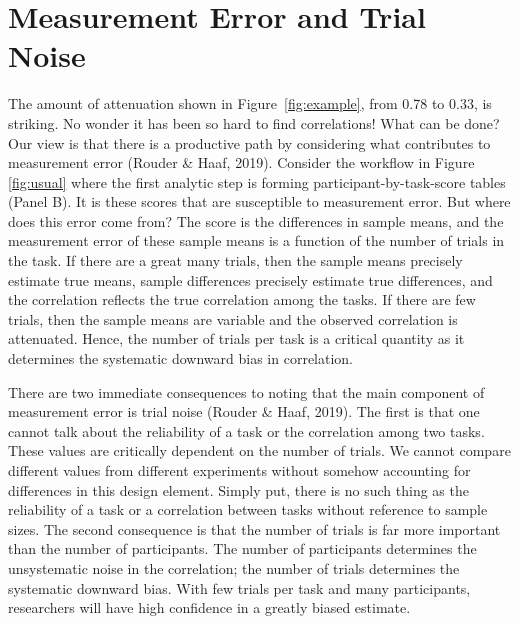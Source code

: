\documentclass[
  english,
  ,man]{apa6}
\begin{document}
\hypertarget{measurement-error-and-trial-noise}{%
\section{Measurement Error and Trial Noise}\label{measurement-error-and-trial-noise}}

The amount of attenuation shown in Figure~\ref{fig:example}, from 0.78 to 0.33, is striking. No wonder it has been so hard to find correlations! What can be done? Our view is that there is a productive path by considering what contributes to measurement error (Rouder \& Haaf, 2019). Consider the workflow in Figure \ref{fig:usual} where the first analytic step is forming participant-by-task-score tables (Panel B). It is these scores that are susceptible to measurement error. But where does this error come from? The score is the differences in sample means, and the measurement error of these sample means is a function of the number of trials in the task. If there are a great many trials, then the sample means precisely estimate true means, sample differences precisely estimate true differences, and the correlation reflects the true correlation among the tasks. If there are few trials, then the sample means are variable and the observed correlation is attenuated. Hence, the number of trials per task is a critical quantity as it determines the systematic downward bias in correlation.

There are two immediate consequences to noting that the main component of measurement error is trial noise (Rouder \& Haaf, 2019). The first is that one cannot talk about the reliability of a task or the correlation among two tasks. These values are critically dependent on the number of trials. We cannot compare different values from different experiments without somehow accounting for differences in this design element. Simply put, there is no such thing as the reliability of a task or a correlation between tasks without reference to sample sizes. The second consequence is that the number of trials is far more important than the number of participants. The number of participants determines the unsystematic noise in the correlation; the number of trials determines the systematic downward bias. With few trials per task and many participants, researchers will have high confidence in a greatly biased estimate.
\end{document}
